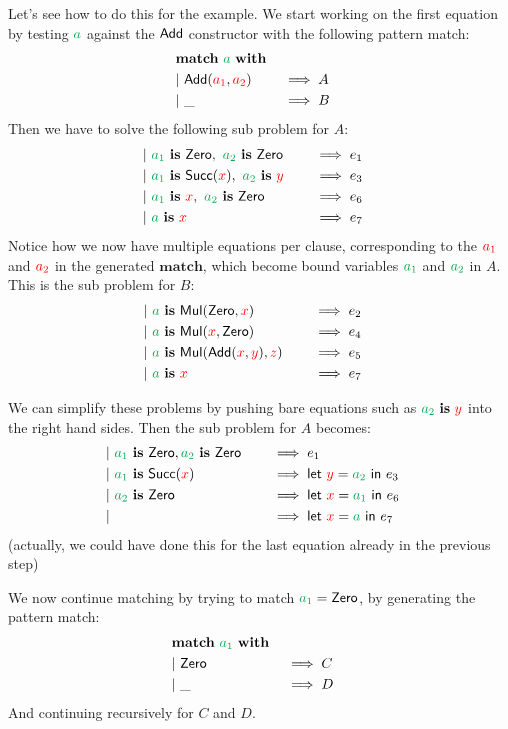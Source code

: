 \documentclass[a4paper, 11pt]{article}
\theoremstyle{definition}
\begin{document}
Let's see how to do this for the example. We start working on the first equation by testing $\ba$ against the $\mathsf{\textcolor{black}{Add}}$ constructor with the following pattern match:
\begin{alignat*}{4}
  \matchwith{\ba} \\
  \clause{\Add(\fvar{a_1}, \fvar{a_2})}{A} \\
  \clause{\_}{B}
\end{alignat*}
Then we have to solve the following sub problem for $A$:
\begin{alignat*}{4}
  \clause{\bvar{a_1} \is \Zero,\ \bvar{a_2} \is \Zero}{e_1} \\
  \clause{\bvar{a_1} \is \Succ(\fvar x),\ \bvar{a_2} \is \fvar y}{e_3} \\
  \clause{\bvar{a_1} \is \fvar x,\ \bvar{a_2} \is \Zero}{e_6} \\
  \clause{\ba \is \fvar x}{e_7}
\end{alignat*}
Notice how we now have multiple equations per clause, corresponding to the $\textcolor{red}{a_1}$ and $\textcolor{red}{a_2}$ in the generated $\mathbf{match}$, which become bound variables $\bvar{a_1}$ and $\bvar{a_2}$ in $A$. This is the sub problem for $B$:
\begin{alignat*}{4}
  \clause{\ba \is \Mul(\Zero, \fvar{x})}{e_2} \\
  \clause{\ba \is \Mul(\fvar x, \Zero)}{e_4} \\
  \clause{\ba \is \Mul(\Add(\fvar x, \fvar y), \fvar z)}{e_5} \\
  \clause{\ba \is \fvar x}{e_7}
\end{alignat*}

We can simplify these problems by pushing bare equations such as $\bvar{a_2} \is \fvar y$ into the right hand sides. Then the sub problem for $A$ becomes:
\begin{alignat*}{4}
  \clause{\bvar{a_1} \is \Zero, \bvar{a_2} \is \Zero}{e_1} \\
  \clause{\bvar{a_1} \is \Succ(\fvar x)}{\lett{\fvar y}{\bvar{a_2}} e_3} \\
  \clause{\bvar{a_2} \is \Zero}{\lett{\fvar x}{\bvar{a_1}} e_6} \\
  \clause{}{\lett{\fvar x}{\bvar{a}} e_7}
\end{alignat*}
(actually, we could have done this for the last equation already in the previous step)

We now continue matching by trying to match $\bvar{a_1} = \Zero$, by generating the pattern match:
\begin{alignat*}{4}
  \matchwith{\bvar{a_1}} \\
  \clause{\Zero}{C} \\
  \clause{\_}{D}
\end{alignat*}
And continuing recursively for $C$ and $D$.
\end{document}
